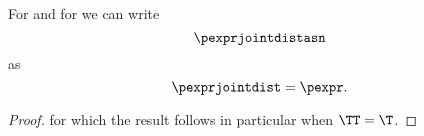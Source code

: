 \begin{proposition}
  For \ctext{\pexprdom} and for \ctext{\pexprdompol,} 
  we can write
  $$\pexprjointdistasn$$ as
  $$ \pexprjointdist = \pexpr.$$%
\end{proposition}

\begin{proof}
  for which the result follows in particular when $\TT = \T$.
\end{proof}
